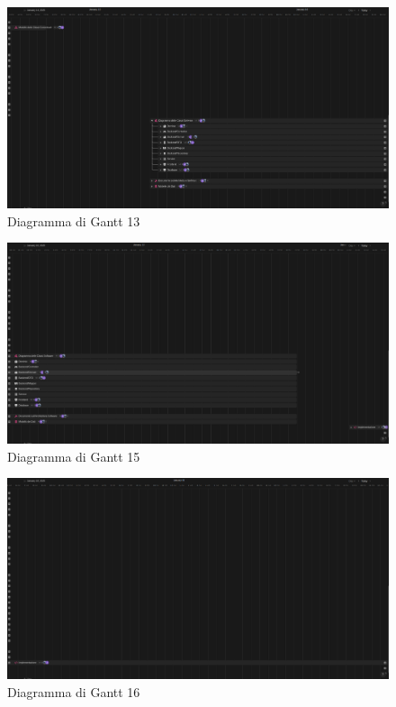 \documentclass[12pt]{article}
\begin{document}
\begin{figure}[H]
    \includegraphics[width=\textwidth,keepaspectratio]{Immagini/Gantt/Iterazione 2/Gantt14.png}
        \caption{Diagramma di Gantt 13} 
        \label{fig:Gantt13}
\end{figure}

\begin{figure}[H]
    \includegraphics[width=\textwidth,keepaspectratio]{Immagini/Gantt/Iterazione 2/Gantt15.png}
        \caption{Diagramma di Gantt 15} 
        \label{fig:Gantt15}
\end{figure}

\begin{figure}[H]
    \includegraphics[width=\textwidth,keepaspectratio]{Immagini/Gantt/Iterazione 2/Gantt16.png}
        \caption{Diagramma di Gantt 16} 
        \label{fig:Gantt16}
\end{figure}
\end{document}
